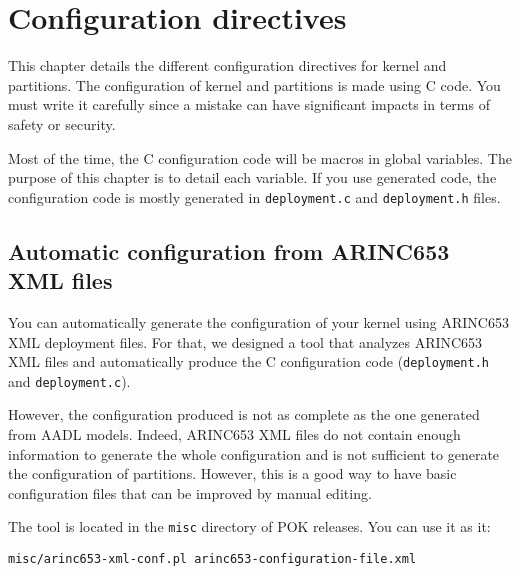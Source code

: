 %
% 
%
%
%
%
%


\chapter{Configuration directives}

This chapter details the different configuration directives for kernel and
partitions. The configuration of kernel and partitions is made using C code. You
must write it carefully since a mistake can have significant impacts in terms of
safety or security.

Most of the time, the C configuration code will be macros in global variables.
The purpose of this chapter is to detail each variable. If you use generated
code, the configuration code is mostly generated in \texttt{deployment.c} and
\texttt{deployment.h} files.

\section{Automatic configuration from ARINC653 XML files}
\label{section-arinc653-xml-configuration}
You can automatically generate the configuration of your kernel using ARINC653
XML deployment files. For that, we designed a tool that analyzes ARINC653 XML
files and automatically produce the C configuration code (\texttt{deployment.h}
and \texttt{deployment.c}).

However, the configuration produced is not as complete as the one generated from
AADL models. Indeed, ARINC653 XML files do not contain enough information to
generate the whole configuration and is not sufficient to generate the
configuration of partitions. However, this is a good way to have basic
configuration files that can be improved by manual editing.

The tool is located in the \texttt{misc} directory of POK releases. You can use
it as it:
\begin{verbatim}
misc/arinc653-xml-conf.pl arinc653-configuration-file.xml
\end{verbatim}

